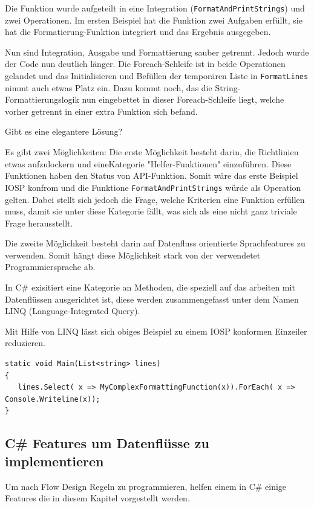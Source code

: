 \documentclass[11pt]{article}
\begin{document}
Die Funktion wurde aufgeteilt in eine Integration (\texttt{FormatAndPrintStrings}) und zwei Operationen.
Im ersten Beispiel hat die Funktion zwei Aufgaben erfüllt, sie hat die Formatierung-Funktion integriert und 
das Ergebnis ausgegeben.

Nun sind Integration, Ausgabe und Formattierung sauber getrennt.
Jedoch wurde der Code nun deutlich länger. Die Foreach-Schleife ist in beide Operationen gelandet und das Initialisieren und
Befüllen der temporären Liste in \texttt{FormatLines} nimmt auch etwas Platz ein.
Dazu kommt noch, das die String-Formattierungslogik nun eingebettet in dieser Foreach-Schleife liegt, welche vorher getrennt in
einer extra Funktion sich befand. 

Gibt es eine elegantere Lösung?

Es gibt zwei Möglichkeiten: Die erste Möglichkeit besteht darin, die Richtlinien etwas aufzulockern und eineKategorie "Helfer-Funktionen" einzuführen.
Diese Funktionen haben den Status von API-Funktion. Somit wäre das erste Beispiel IOSP konfrom und die Funktione \texttt{FormatAndPrintStrings}
würde als Operation gelten.
Dabei stellt sich jedoch die Frage, welche Kriterien eine Funktion erfüllen muss, damit sie unter diese Kategorie 
fällt, was sich als eine nicht ganz triviale Frage herausstellt.

Die zweite Möglichkeit besteht darin auf Datenfluss orientierte Sprachfeatures zu verwenden.
Somit hängt diese Möglichkeit stark von der verwendetet Programmiersprache ab.

In C\# exisitiert eine Kategorie an Methoden, die speziell auf das arbeiten mit Datenflüssen ausgerichtet ist, diese werden 
zusammengefasst unter dem Namen LINQ (Language-Integrated Query).

Mit Hilfe von LINQ lässt sich obiges Beispiel zu einem IOSP konformen Einzeiler reduzieren.

\begin{verbatim}
static void Main(List<string> lines)
{
   lines.Select( x => MyComplexFormattingFunction(x)).ForEach( x => Console.Writeline(x));
}
\end{verbatim}

\subsection{C\# Features um Datenflüsse zu implementieren}
\label{sec:orgheadline29}
Um nach Flow Design Regeln zu programmieren, helfen einem in C\# einige Features die in diesem Kapitel vorgestellt werden.
\end{document}
